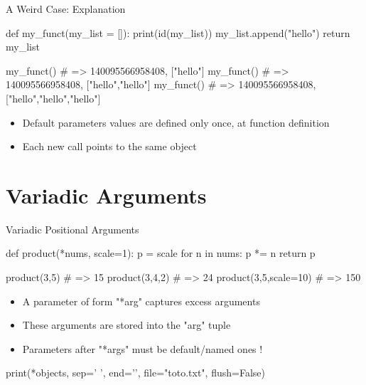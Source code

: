 \documentclass[serif, aspectratio=169]{beamer}
\begin{document}
\begin{frame}[fragile]{A Weird Case: Explanation}
    \begin{pythoncode}
    def my_funct(my_list = []):
        print(id(my_list))
        my_list.append("hello")
        return my_list
    
    my_funct() # => 140095566958408, ["hello"]
    my_funct() # => 140095566958408, ["hello","hello"]
    my_funct() # => 140095566958408, ["hello","hello","hello"]
    \end{pythoncode}
    \begin{block}{}
        \begin{itemize}
            \item Default parameters values are defined only once, at function definition
            \item Each new call points to the same object
        \end{itemize}
    \end{block}
\end{frame}


\section{Variadic Arguments}

\begin{frame}[fragile]{Variadic Positional Arguments}
    \begin{pythoncode}
    def product(*nums, scale=1):
        p = scale
        for n in nums:
            p *= n
        return p

    product(3,5) # => 15
    product(3,4,2) # => 24
    product(3,5,scale=10) # => 150
    \end{pythoncode}
    \vspace{10pt}
    \begin{itemize}
        \item A parameter of form "*arg" captures excess arguments
        \item These arguments are stored into the "arg" tuple
        \item Parameters after "*args" must be default/named ones !
    \end{itemize}
    \vspace{10pt}
    \begin{pythoncode}
    print(*objects, sep=' ', end='\n', file="toto.txt", flush=False)
    \end{pythoncode}
\end{frame}
\end{document}
